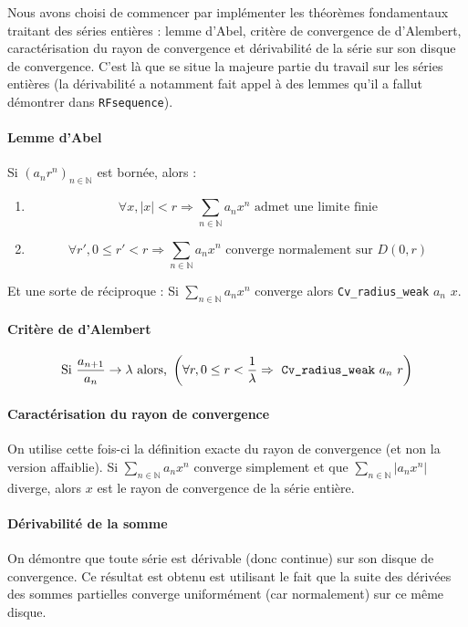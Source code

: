 \documentclass{article}
\newcommand{\coqcode}[1]{\texttt{#1}}
\begin{document}
Nous avons choisi de commencer par implémenter les théorèmes fondamentaux traitant des séries entières : lemme d'Abel, critère de convergence de d'Alembert, caractérisation du rayon de convergence et dérivabilité de la série sur son disque de convergence. C'est là que se situe la majeure partie du travail sur les séries entières (la dérivabilité a notamment fait appel à des lemmes qu'il a fallut démontrer dans \coqcode{RFsequence}).

\paragraph{Lemme d'Abel} Si $\left(a_n r^n\right)_{n\in \mathbb{N}}$ est bornée, alors :
\begin{enumerate}
 \item $$\forall x, |x| < r \Rightarrow \sum_{n\in \mathbb{N}} a_n x^n \text{ admet une limite finie}$$
 \item $$\forall r', 0 \le r' < r \Rightarrow \sum_{n\in \mathbb{N}} a_n x^n \text{ converge normalement sur } D\left(0,r\right)$$
\end{enumerate}

Et une sorte de réciproque : Si $\sum_{n\in \mathbb{N}} a_n x^n$ converge alors \coqcode{Cv\_radius\_weak} $a_n$ $x$.

\paragraph{Critère de d'Alembert} $$\text{Si } \frac{a_{n + 1}}{a_n} \rightarrow \lambda \text{ alors, } \left( \forall r, 0 \le r < \frac{1}{\lambda} \Rightarrow \text{ \coqcode{Cv\_radius\_weak} } a_n~ r\right)$$

\paragraph{Caractérisation du rayon de convergence} On utilise cette fois-ci la définition exacte du rayon de convergence (et non la version affaiblie). Si $\sum_{n\in \mathbb{N}} a_n x^n$ converge simplement et que $\sum_{n\in \mathbb{N}} |a_n x^n|$ diverge, alors $x$ est le rayon de convergence de la série entière.

\paragraph{Dérivabilité de la somme} On démontre que toute série est dérivable (donc continue) sur son disque de convergence. Ce résultat est obtenu est utilisant le fait que la suite des dérivées des sommes partielles converge uniformément (car normalement) sur ce même disque.
\end{document}
